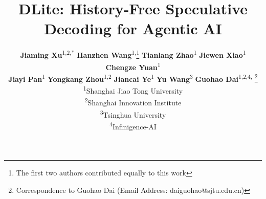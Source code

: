 \documentclass{article} %
\title{DLite: History-Free Speculative Decoding for Agentic AI}
\author{
\normalfont
\textbf{Jiaming Xu}\textsuperscript{1,2,*}\quad
\textbf{Hanzhen Wang}\textsuperscript{1,}\thanks{The first two authors contributed equally to this work}\quad
\textbf{Tianlang Zhao}\textsuperscript{1}\quad
\textbf{Jiewen Xiao}\textsuperscript{1}\quad
\textbf{Chengze Yuan}\textsuperscript{1} \\
\normalfont
\textbf{Jiayi Pan}\textsuperscript{1}\quad
\textbf{Yongkang Zhou}\textsuperscript{1,2}\quad
\textbf{Jiancai Ye}\textsuperscript{1}\quad
\textbf{Yu Wang}\textsuperscript{3}\quad
\textbf{Guohao Dai}\textsuperscript{1,2,4,}
\thanks{Correspondence to Guohao Dai (Email Address: daiguohao@sjtu.edu.cn)}
\\[0.5em]
\normalfont\textsuperscript{1}Shanghai Jiao Tong University \\
\normalfont\textsuperscript{2}Shanghai Innovation Institute \\
\normalfont\textsuperscript{3}Tsinghua University \\
\normalfont\textsuperscript{4}Infinigence-AI
}
\newcommand{\we}{\emph{DLite}\xspace}
\begin{document}
\begingroup
\iclrfinalcopy
\maketitle
\endgroup
\fancyhead{}

\begin{abstract}



\end{abstract}
\end{document}
